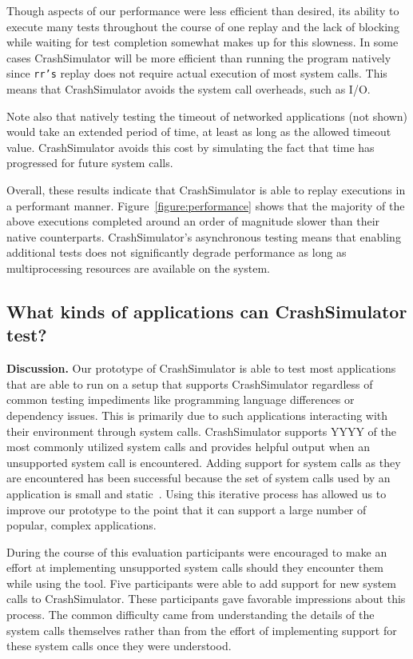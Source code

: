 Though aspects of our performance were less efficient than desired, its
ability to execute many tests throughout the course of one replay and the
lack of blocking while waiting for test completion somewhat makes up for
this slowness. In some cases CrashSimulator will be more efficient than
running the program natively since {\tt rr's} replay does not require
actual execution of most system calls.  This means that CrashSimulator
avoids the system call overheads, such as I/O.

Note also that natively testing the timeout of networked applications (not
shown) would take an extended period of time, at least as long as the
allowed timeout value.  CrashSimulator avoids this cost by simulating the
fact that time has progressed for future system calls.

Overall, these results indicate that CrashSimulator is able to replay
executions in a performant manner.  Figure~\ref{figure:performance} shows
that the majority of the above executions completed around an order of
magnitude slower than their native counterparts.  CrashSimulator's
asynchronous testing means that enabling additional tests does not
significantly degrade performance as long as multiprocessing resources are
available on the system.


\subsection{What kinds of applications can CrashSimulator test?}


{\bf Discussion.} Our prototype of CrashSimulator is able to test most
applications that are able to run on a setup that supports CrashSimulator
regardless of common testing impediments like programming language
differences or dependency issues.  This is primarily due to such
applications interacting with their environment through system calls.
CrashSimulator supports YYYY of the most commonly utilized system calls and
provides helpful output when an unsupported system call is encountered.
Adding support for system calls as they are encountered has been successful
because the set of system calls used by an application is small and
static~\cite{Tsai:2016:SML:2901318.2901341}.  Using this iterative process
has allowed us to improve our prototype to the point that it can support a
large number of popular, complex applications.

During the course of this evaluation participants were encouraged to make
an effort at implementing unsupported system calls should they encounter
them while using the tool.  Five participants were able to add support for
new system calls to CrashSimulator.  These participants gave favorable
impressions about this process.  The common difficulty came from
understanding the details of the system calls themselves rather than from
the effort of implementing support for these system calls once they were
understood.

